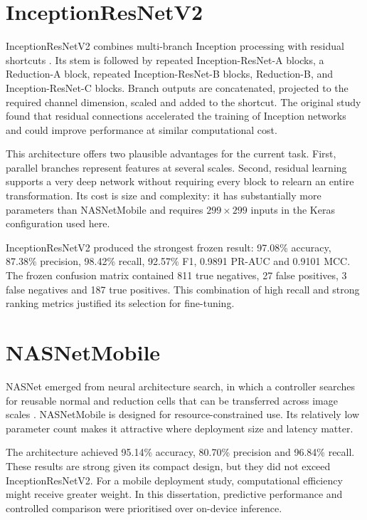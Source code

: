 \section{InceptionResNetV2}
InceptionResNetV2 combines multi-branch Inception processing with residual shortcuts \citep{szegedy2017inceptionresnet}. Its stem is followed by repeated Inception-ResNet-A blocks, a Reduction-A block, repeated Inception-ResNet-B blocks, Reduction-B, and Inception-ResNet-C blocks. Branch outputs are concatenated, projected to the required channel dimension, scaled and added to the shortcut. The original study found that residual connections accelerated the training of Inception networks and could improve performance at similar computational cost.

This architecture offers two plausible advantages for the current task. First, parallel branches represent features at several scales. Second, residual learning supports a very deep network without requiring every block to relearn an entire transformation. Its cost is size and complexity: it has substantially more parameters than NASNetMobile and requires $299\times299$ inputs in the Keras configuration used here.

InceptionResNetV2 produced the strongest frozen result: 97.08\% accuracy, 87.38\% precision, 98.42\% recall, 92.57\% F1, 0.9891 PR-AUC and 0.9101 MCC. The frozen confusion matrix contained 811 true negatives, 27 false positives, 3 false negatives and 187 true positives. This combination of high recall and strong ranking metrics justified its selection for fine-tuning.

\section{NASNetMobile}
NASNet emerged from neural architecture search, in which a controller searches for reusable normal and reduction cells that can be transferred across image scales \citep{zoph2018learning}. NASNetMobile is designed for resource-constrained use. Its relatively low parameter count makes it attractive where deployment size and latency matter.

The architecture achieved 95.14\% accuracy, 80.70\% precision and 96.84\% recall. These results are strong given its compact design, but they did not exceed InceptionResNetV2. For a mobile deployment study, computational efficiency might receive greater weight. In this dissertation, predictive performance and controlled comparison were prioritised over on-device inference.

